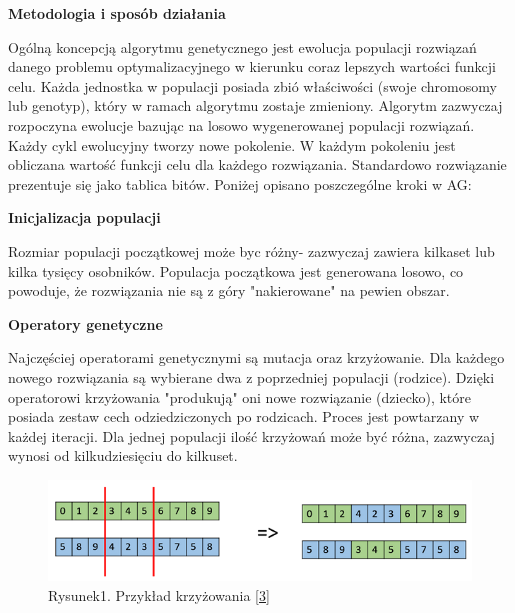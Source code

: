 \documentclass[a4paper, twoside, 12pt, justified]{article}
\begin{document}
	\begin{large}
		\begin{center}
			\textbf{Metodologia i sposób działania}
		\end{center}
	\end{large}
	
	Ogólną koncepcją algorytmu genetycznego jest ewolucja populacji rozwiązań danego problemu optymalizacyjnego w kierunku coraz lepszych wartości funkcji celu. Każda jednostka w populacji posiada zbió właściwości (swoje chromosomy lub genotyp), który w ramach algorytmu zostaje zmieniony. Algorytm zazwyczaj rozpoczyna ewolucje bazując na losowo wygenerowanej populacji rozwiązań. Każdy cykl ewolucyjny tworzy nowe pokolenie. W każdym pokoleniu jest obliczana wartość funkcji celu dla każdego rozwiązania. Standardowo rozwiązanie prezentuje się jako tablica bitów. Poniżej opisano poszczególne kroki w AG:\\
	
	\begin{center}
		\textbf{Inicjalizacja populacji}
	\end{center}
	
	Rozmiar populacji początkowej może byc różny- zazwyczaj zawiera kilkaset lub kilka tysięcy osobników. Populacja początkowa jest generowana losowo, co powoduje, że rozwiązania nie są z góry "nakierowane" na pewien obszar.
	
	\begin{center}
		\textbf{Operatory genetyczne}
	\end{center}  
	
	Najczęściej operatorami genetycznymi są mutacja oraz krzyżowanie. Dla każdego nowego rozwiązania są wybierane dwa z poprzedniej populacji (rodzice). Dzięki operatorowi krzyżowania "produkują" oni nowe rozwiązanie (dziecko), które posiada zestaw cech odziedziczonych po rodzicach. Proces jest powtarzany w każdej iteracji. Dla jednej populacji ilość krzyżowań może być różna, zazwyczaj wynosi od kilkudziesięciu do kilkuset.
	
	\begin{figure}[h]
		\includegraphics[scale=1]{cross}
		\centering
		\\
		{Rysunek1. Przykład krzyżowania \hyperlink{cross}{[3]} } 
	\end{figure}
\end{document}
